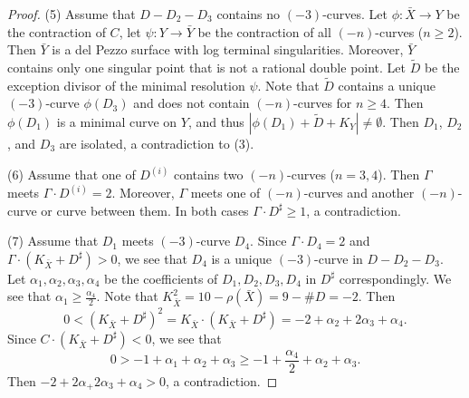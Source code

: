 \documentclass[10pt,oneside,reqno]{amsart}
\theoremstyle{definition}
\theoremstyle{remark}
\numberwithin{equation}{section}
\begin{document}
\begin{proof}
(5) Assume that $D-D_2-D_3$ contains no $(-3)$-curves. Let $\phi\colon\bar{X}\rightarrow Y$ be the contraction of $C$, let $\psi\colon Y\rightarrow\bar{Y}$ be the contraction of all $(-n)$-curves ($n\geq 2$). Then $\bar{Y}$ is a del Pezzo surface with log terminal singularities. Moreover, $\bar{Y}$ contains only one singular point that is not a rational double point. Let $\tilde{D}$ be the exception divisor of the minimal resolution $\psi$. Note that $\tilde{D}$ contains a unique $(-3)$-curve $\phi(D_3)$ and does not contain $(-n)$-curves for $n\geq 4$. Then $\phi(D_1)$ is a minimal curve on $Y$, and thus $|\phi(D_1)+\tilde{D}+K_Y|\neq\emptyset$. Then $D_1$, $D_2$, and $D_3$ are isolated, a contradiction to (3).

(6) Assume that one of $D^{(i)}$ contains two $(-n)$-curves ($n=3,4$). Then $\Gamma$ meets $\Gamma\cdot D^{(i)}=2$. Moreover, $\Gamma$ meets one of $(-n)$-curves and another $(-n)$-curve or curve between them. In both cases $\Gamma\cdot D^{\sharp}\geq 1$, a contradiction.

(7) Assume that $D_1$ meets $(-3)$-curve $D_4$. Since $\Gamma\cdot D_4=2$ and $\Gamma\cdot(K_{\bar{X}}+D^{\sharp})> 0$, we see that $D_4$ is a unique $(-3)$-curve in $D-D_2-D_3$. Let $\alpha_1, \alpha_2,\alpha_3,\alpha_4$ be the coefficients of $D_1, D_2,D_3,D_4$ in $D^{\sharp}$ correspondingly. We see that $\alpha_1\geq\frac{\alpha_4}{2}$.  Note that $K_{\bar{X}}^2=10-\rho(\bar{X})=9-\#D=-2$. Then \[0<(K_{\bar{X}}+D^{\sharp})^2=K_{\bar{X}}\cdot (K_{\bar{X}}+D^{\sharp})=-2+\alpha_2+2\alpha_3+\alpha_4.\] Since $C\cdot(K_{\bar{X}}+D^{\sharp})< 0$, we see that \[0>-1+\alpha_1+\alpha_2+\alpha_3\geq-1+\frac{\alpha_4}{2}+\alpha_2+\alpha_3.\] Then $-2+2\alpha_+2\alpha_3+\alpha_4>0$, a contradiction.


\end{proof}
\end{document}
